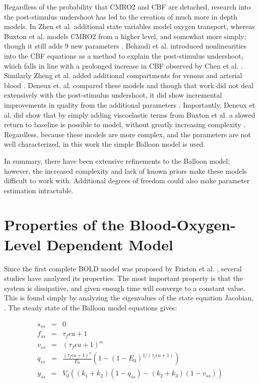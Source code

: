 Regardless of the probability that \ac{CMRO2} and \ac{CBF} are detached,
research into the post-stimulus undershoot has led to the creation
of much more in depth models. In Zhen et al. additional state
variables model oxygen transport, whereas Buxton et al. models
\ac{CMRO2} from a higher level, and somewhat more simply; though it 
still adds 9 new parameters \cite{Zheng2002, Buxton2004}. Behzadi et al. 
introduced nonlinearities into the \ac{CBF} equations as a method to
explain the post-stimulus undershoot, which falls in line with a 
prolonged increase in \ac{CBF} observed by Chen et al. \cite{Behzadi2005, Chen2009}. 
Similarly Zheng et al. added additional compartments for 
venous and arterial blood \cite{Zheng2005}. 
Deneux et. al. compared these models and though 
that work did not deal extensively with the 
post-stimulus undershoot, it did show incremental improvements
in quality from the additional parameters \cite{Deneux2006}.  
Importantly, Deneux et al. did show that by 
simply adding viscoelastic terms from Buxton et al. a slowed return 
to baseline is possible to model, without greatly increasing
complexity \cite{Deneux2006, Buxton2004}. Regardless, because these models are more 
complex, and the parameters are not well characterized, in this work the simple
Balloon model is used. 

In summary, there have been extensive refinements to the Balloon
model; however, the increased complexity and lack of known priors 
make these models difficult to work with. Additional degrees of freedom 
could also make parameter estimation intractable.

\section{Properties of the Blood-Oxygen-Level Dependent Model}
\label{sec:BOLD Analysis}
Since the first complete \ac{BOLD} model was proposed by Friston et al. 
\cite{Friston2000},  
several studies have analyzed its properties.  
The most important property is that the system is dissipative, and given
enough time will converge to a constant value. This is found simply by
analyzing the eigenvalues of the state equation Jacobian, 
\cite{Deneux2006, Hu2009}. The steady state of the Balloon
model equations gives:

\begin{eqnarray}
s_{ss} &=& 0 \nonumber \\
f_{ss} &=& \tau_f\epsilon u + 1\nonumber \\
v_{ss} &=& (\tau_f\epsilon u + 1)^\alpha\nonumber \\
q_{ss} &=& \frac{(\tau_f\epsilon u + 1)^\alpha}{E_0}(1-(1-E_0)^{1/(\tau_f\epsilon u + 1)})\nonumber \\
y_{ss} &=& V_0((k_1+k_2)(1-q_{ss}) - (k_2+k_3)(1-v_{ss}))
\label{eq:steadystate}
\end{eqnarray}

